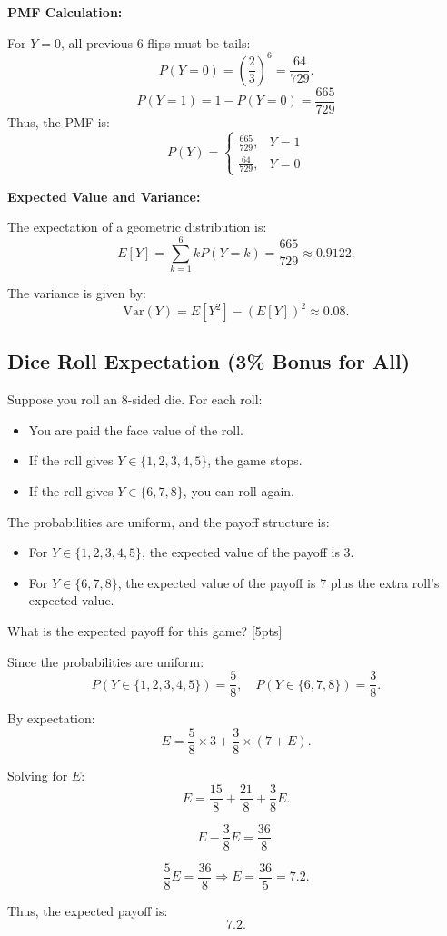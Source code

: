 \documentclass{article}
\begin{document}
\textbf{PMF Calculation:}

For $Y=0$, all previous 6 flips must be tails:
\[
P(Y=0) = \left(\frac{2}{3}\right)^6 = \frac{64}{729}.
\]
\[
P(Y = 1) = 1 - P(Y=0) = \frac{665}{729}
\]
Thus, the PMF is:
\[
P(Y) =
\begin{cases}
    \frac{665}{729}, & Y = 1 \\
    \frac{64}{729}, & Y = 0
\end{cases}
\]

\textbf{Expected Value and Variance:}

The expectation of a geometric distribution is:
\[
E[Y] = \sum_{k=1}^{6} k P(Y=k) = \frac{665}{729} \approx 0.9122.
\]

The variance is given by:
\[
\text{Var}(Y) = E[Y^2] - (E[Y])^2 \approx 0.08.
\]

\newpage

\subsection{Dice Roll Expectation (3\% Bonus for All)}
Suppose you roll an 8-sided die. For each roll:
\begin{itemize}
\item You are paid the face value of the roll.
\item If the roll gives $Y \in \{1, 2, 3, 4, 5\}$, the game stops.
\item If the roll gives $Y \in \{6, 7, 8\}$, you can roll again.
\end{itemize}
The probabilities are uniform, and the payoff structure is:
\begin{itemize}
\item For $Y \in \{1, 2, 3, 4, 5\}$, the expected value of the payoff is 3.
\item For $Y \in \{6, 7, 8\}$, the expected value of the payoff is 7 plus the extra roll's expected value.
\end{itemize}

What is the expected payoff for this game? [5pts]

Since the probabilities are uniform:
\[
P(Y \in \{1,2,3,4,5\}) = \frac{5}{8}, \quad P(Y \in \{6,7,8\}) = \frac{3}{8}.
\]

By expectation:
\[
E = \frac{5}{8} \times 3 + \frac{3}{8} \times (7 + E).
\]

Solving for $E$:
\[
E = \frac{15}{8} + \frac{21}{8} + \frac{3}{8}E.
\]

\[
E - \frac{3}{8}E = \frac{36}{8}.
\]

\[
\frac{5}{8}E = \frac{36}{8} \Rightarrow E = \frac{36}{5} = 7.2.
\]

Thus, the expected payoff is:
\[
\mathbf{7.2}.
\]

\newpage

\end{document}
